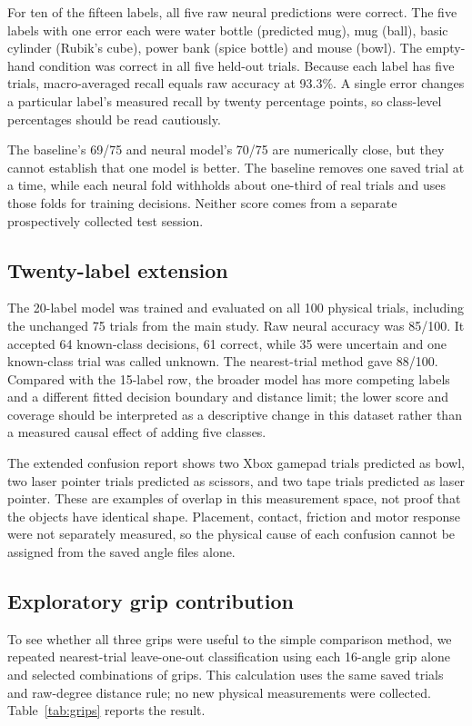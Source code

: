 \documentclass[12pt,a4paper]{article}
\begin{document}
For ten of the fifteen labels, all five raw neural predictions were correct. The five labels with one error each were water bottle (predicted mug), mug (ball), basic cylinder (Rubik's cube), power bank (spice bottle) and mouse (bowl). The empty-hand condition was correct in all five held-out trials. Because each label has five trials, macro-averaged recall equals raw accuracy at 93.3\%. A single error changes a particular label's measured recall by twenty percentage points, so class-level percentages should be read cautiously.

The baseline's 69/75 and neural model's 70/75 are numerically close, but they cannot establish that one model is better. The baseline removes one saved trial at a time, while each neural fold withholds about one-third of real trials and uses those folds for training decisions. Neither score comes from a separate prospectively collected test session.

\subsection{Twenty-label extension}

The 20-label model was trained and evaluated on all 100 physical trials, including the unchanged 75 trials from the main study. Raw neural accuracy was 85/100. It accepted 64 known-class decisions, 61 correct, while 35 were uncertain and one known-class trial was called unknown. The nearest-trial method gave 88/100. Compared with the 15-label row, the broader model has more competing labels and a different fitted decision boundary and distance limit; the lower score and coverage should be interpreted as a descriptive change in this dataset rather than a measured causal effect of adding five classes.

The extended confusion report shows two Xbox gamepad trials predicted as bowl, two laser pointer trials predicted as scissors, and two tape trials predicted as laser pointer. These are examples of overlap in this measurement space, not proof that the objects have identical shape. Placement, contact, friction and motor response were not separately measured, so the physical cause of each confusion cannot be assigned from the saved angle files alone.

\subsection{Exploratory grip contribution}

To see whether all three grips were useful to the simple comparison method, we repeated nearest-trial leave-one-out classification using each 16-angle grip alone and selected combinations of grips. This calculation uses the same saved trials and raw-degree distance rule; no new physical measurements were collected. Table~\ref{tab:grips} reports the result.
\end{document}
